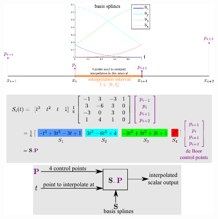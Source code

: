		\begin{figure}
			\includegraphics[height=0.85\textheight]{figs/theory_curves_UniformCubicBsplines.pdf}
		\end{figure}
